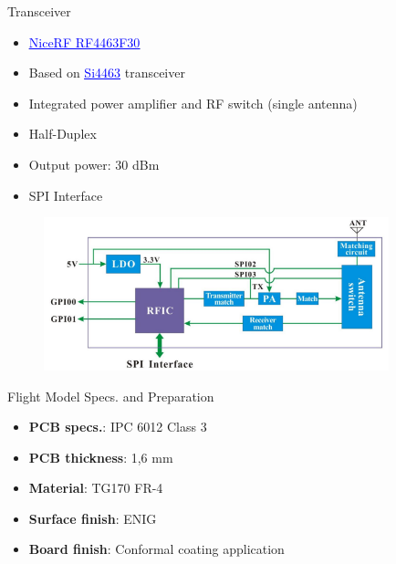 \begin{frame}{Transceiver}

    \begin{itemize}
        \item \href{https://www.nicerf.com/products/detail/1w-rf-module-rf4463f30.html}{\textcolor{blue}{\underline{NiceRF RF4463F30}}}
        \item Based on \href{https://www.silabs.com/wireless/proprietary/ezradiopro-sub-ghz-ics/device.si4463?tab=specs}{\textcolor{blue}{\underline{Si4463}}} transceiver
        \item Integrated power amplifier and RF switch (single antenna)
        \item Half-Duplex
        \item Output power: 30 dBm
        \item SPI Interface
    \end{itemize}
    \begin{figure}[!ht]
        \begin{center}
            \includegraphics[width=10cm]{figures/rf4463f30-block-diagram.png}
        \end{center}
    \end{figure}

\end{frame}

\begin{frame}{Flight Model Specs. and Preparation}

    \begin{itemize}
        \item \textbf{PCB specs.}: IPC 6012 Class 3
        \vspace{0.3cm}
        \item \textbf{PCB thickness}: 1,6 mm
        \vspace{0.3cm}
        \item \textbf{Material}: TG170 FR-4
        \vspace{0.3cm}
        \item \textbf{Surface finish}: ENIG
        \vspace{0.3cm}
        \item \textbf{Board finish}: Conformal coating application
    \end{itemize}

\end{frame}
